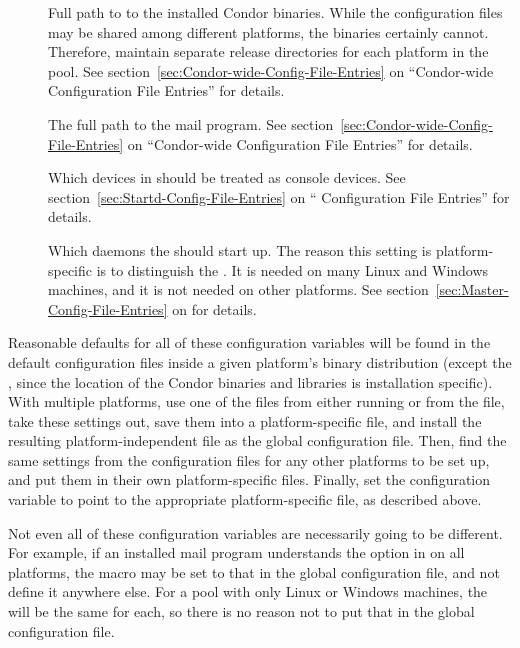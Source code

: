 \begin{description}

\item[] Full path to to the installed
  Condor binaries.  While the configuration files may be shared among
  different platforms, the binaries certainly cannot.  Therefore,
  maintain separate release directories for each platform
  in the pool.  See section~\ref{sec:Condor-wide-Config-File-Entries}
  on ``Condor-wide Configuration File Entries'' for details.

\item[] The full path to the mail program.  See
  section~\ref{sec:Condor-wide-Config-File-Entries} on ``Condor-wide
  Configuration File Entries'' for details.

\item[] Which devices in  should be
  treated as console devices.  See
  section~\ref{sec:Startd-Config-File-Entries} on ``
  Configuration File Entries'' for details.

\item[] Which daemons the  should
  start up.  The reason this setting is platform-specific is
  to distinguish the .
  It is needed on many Linux and Windows machines,
  and it is not needed on other platforms.
  See section~\ref{sec:Master-Config-File-Entries} on
  for details.

\end{description}

Reasonable defaults for all of these configuration variables
will be found in the
default configuration files inside a given platform's binary distribution
(except the , since 
the location of the Condor binaries and libraries is installation specific).
With multiple platforms,
use one of the  files from
either running  or from the
 file,
take these settings out,
save them into a platform-specific file,
and install the resulting platform-independent file as the global
configuration file.
Then,
find the same settings from the configuration files for any other platforms
to be set up, and put them in their own platform-specific files.
Finally, set the  configuration variable
to point to
the appropriate platform-specific file, as described above.

Not even all of these configuration variables are necessarily
going to be different.
For example, if an installed mail program understands the
 option in  on all platforms,
the  macro may be set to that in the global configuration
file, and not define it anywhere else.
For a pool with only Linux or Windows machines,
the  will be the same for each, so there is no
reason not to put that in the global configuration file.

